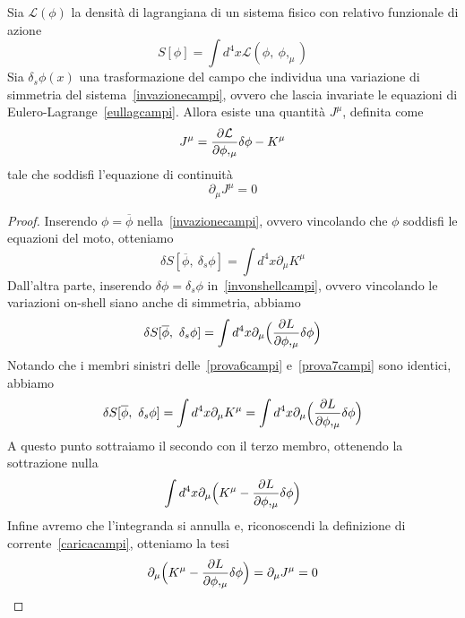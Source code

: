     \begin{theorem}
        Sia $\mathcal L(\phi)$ la densità di lagrangiana di un sistema fisico con relativo funzionale di azione
    \begin{equation*}
        S[\phi] = \int d^4 x \mathcal L(\phi,~\phi,_\mu)
    \end{equation*}
        Sia $\delta_s \phi(x)$ una trasformazione del campo che individua una variazione di simmetria del sistema~\eqref{invazionecampi}, ovvero che lascia invariate le equazioni di Eulero-Lagrange~\eqref{eullagcampi}. Allora esiste una quantità $J^\mu$, definita come
    \begin{equation}\label{caricacampi}
        J^\mu = \frac{\partial\mathcal L}{\partial\phi,_\mu} \delta \phi - K^\mu 
    \end{equation}
        tale che soddisfi l'equazione di continuità
    \begin{equation} \label{thcampi}
        \partial_\mu J^\mu = 0
    \end{equation}
    \end{theorem}

    \begin{proof}
        Inserendo $\phi = \overline \phi$ nella~\eqref{invazionecampi}, ovvero vincolando che $\phi$ soddisfi le equazioni del moto, otteniamo 
    \begin{equation}\label{prova6campi}
        \delta S[\overline \phi, ~\delta_s \phi] = \int d^4 x \partial_\mu K^\mu
    \end{equation}
        Dall'altra parte, inserendo $\delta \phi = \delta_s \phi$ in~\eqref{invonshellcampi}, ovvero vincolando le variazioni on-shell siano anche di simmetria, abbiamo
    \begin{equation}\label{prova7campi}
        \delta S[\overline \phi,~\delta_s \phi] = \int d^4 x \partial_\mu \Big ( \frac{\partial L}{\partial\phi,_\mu}  \delta \phi \Big)
    \end{equation}
        Notando che i membri sinistri delle~\eqref{prova6campi} e~\eqref{prova7campi} sono identici, abbiamo
    \begin{equation}
        \delta S[\overline \phi, ~\delta_s \phi] = \int d^4 x \partial_\mu K^\mu = \int d^4 x \partial_\mu \Big ( \frac{\partial L}{\partial\phi,_\mu}  \delta \phi \Big)
    \end{equation}
        A questo punto sottraiamo il secondo con il terzo membro, ottenendo la sottrazione nulla
    \begin{equation}
        \int d^4 x \partial_\mu \Big ( K^\mu - \frac{\partial L}{\partial\phi,_\mu}  \delta \phi \Big)
    \end{equation}
        Infine avremo che l'integranda si annulla e, riconoscendi la definizione di corrente~\eqref{caricacampi}, otteniamo la tesi
    \begin{equation}
        \partial_\mu \Big ( K^\mu - \frac{\partial L}{\partial\phi,_\mu}  \delta \phi \Big) = \partial_\mu J^\mu = 0
    \end{equation}
    \end{proof}

